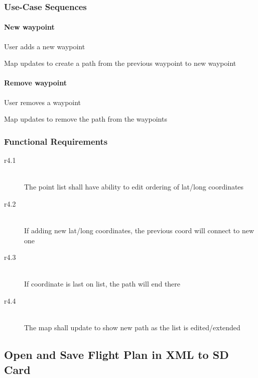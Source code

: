 \documentclass[12pt, letterpaper]{article}
\begin{document}
        \subsubsection{Use-Case Sequences}
          \begin{description}
              \paragraph{New waypoint}
            \item[Step 1] User adds a new waypoint
            \item[Step 2] Map updates to create a path from the previous waypoint to new waypoint
              \paragraph{Remove waypoint}
            \item[Step 1] User removes a waypoint
            \item[Step 2] Map updates to remove the path from the waypoints
          \end{description}
        \subsubsection{Functional Requirements}
        \begin{description}
            \item[r4.1] \hfill \\ The point list shall have ability to edit ordering of lat/long coordinates\\ 
            \item[r4.2] \hfill \\ If adding new lat/long coordinates, the previous coord will connect to new one\\ 
            \item[r4.3] \hfill \\ If coordinate is last on list, the path will end there\\ 
      	    \item[r4.4] \hfill \\  The map shall update to show new path as the list is edited/extended\\ 
          \end{description}
        \subsection{Open and Save Flight Plan in XML to SD Card}
\end{document}
